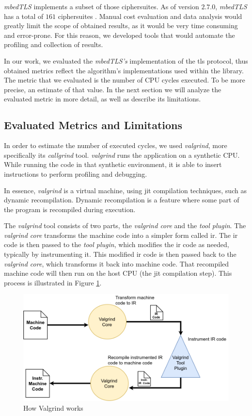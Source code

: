 \documentclass{llncs}
\begin{document}
\textit{mbedTLS} implements a subset of those ciphersuites. As of version $2.7.0$, \textit{mbedTLS}
has a total of $161$ ciphersuites \cite{mbedTLS_ciphers_list:online}. Manual cost evaluation and
data analysis would greatly limit the scope of obtained results, as it would be very time consuming
and error-prone. For this reason, we developed tools that would automate the profiling and collection
of results.

In our work, we evaluated the \textit{mbedTLS's} implementation of the \gls{tls} protocol, thus obtained
metrics reflect the algorithm's implementations used within the library. The metric that we evaluated is the number
of CPU cycles executed. To be more precise, an estimate of that value. In the next section we will analyze the
evaluated metric in more detail, as well as describe its limitations.


\subsection{Evaluated Metrics and Limitations}

In order to estimate the number of executed cycles, we used \textit{valgrind}, more specifically
    its \textit{callgrind} tool. \textit{valgrind} runs the application on a synthetic CPU.
While running the code in that synthetic environment, it is able to insert instructions to perform
profiling and debugging.

In essence, \textit{valgrind} is a virtual machine, using \gls{jit}
compilation techniques, such as dynamic recompilation. Dynamic recompilation is a
feature where some part of the program is recompiled during execution.

The \textit{valgrind} tool consists of two parts, the \textit{valgrind core} and the \textit{tool
plugin}. The \textit{valgrind core} transforms the machine code into a simpler form called
\gls{ir}. The \gls{ir} code is then passed to the \textit{tool plugin}, which modifies the
\gls{ir} code as needed, typically by instrumenting it. This modified \gls{ir} code is then passed back to the
\textit{valgrind core}, which transforms it back into machine code. That recompiled machine code  will then run on the
host CPU (the \gls{jit} compilation step). This process is illustrated in Figure \ref{fig:how_valgrind_works}.

\begin{figure}
  \centering
  \includegraphics[width=1.0\textwidth]{img/how_valgrind_works.png}
  \centering \caption{\label{fig:how_valgrind_works} How Valgrind works}
\end{figure}
\end{document}

